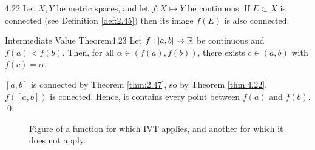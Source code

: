 \setcounter{rudin}{21}
\begin{theorem}{}{4.22}
    Let $X, Y$ be metric spaces, and let $f: X \mapsto Y$ be continuous. If $E \subset X$ is connected (see Definition \ref{def:2.45}) then its image $f(E)$ is also connected.
\end{theorem}
\begin{nproof}
    
\end{nproof}

\begin{theorem}{Intermediate Value Theorem}{4.23}
    Let $f: [a, b] \mapsto \mathbb{R}$ be continuous and $f(a) < f(b)$. Then, for all $\alpha \in (f(a), f(b))$, there exists $c \in (a, b)$ with $f(c) = \alpha$.
\end{theorem}
\begin{nproof}
    $[a, b]$ is connected by Theorem \ref{thm:2.47}, so by Theorem \ref{thm:4.22}, $f([a, b])$ is conected. Hence, it contains every point between $f(a)$ and $f(b)$. \qed
\end{nproof}

\begin{figure}[htbp]
    \centering
    
    \caption{Figure of a function for which IVT applies, and another for which it does not apply.}
    \label{fig20}
\end{figure}